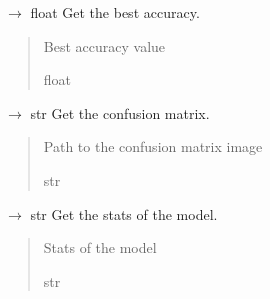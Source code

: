 \documentclass[letterpaper,10pt,english]{sphinxmanual}
\begin{document}

\begin{fulllineitems}
\label{\detokenize{autoapi/src/LSTMTrainer/index:src.LSTMTrainer.get_best_acc}}
\pysigstartsignatures
\pysiglinewithargsret
{}
{}
{{ $\rightarrow$ float}}
\pysigstopsignatures
\sphinxAtStartPar
Get the best accuracy.
\begin{quote}\begin{description}
\sphinxAtStartPar
Best accuracy value

\sphinxAtStartPar
float

\end{description}\end{quote}

\end{fulllineitems}


\begin{fulllineitems}
\label{\detokenize{autoapi/src/LSTMTrainer/index:src.LSTMTrainer.get_confusion_matrix}}
\pysigstartsignatures
\pysiglinewithargsret
{}
{}
{{ $\rightarrow$ str}}
\pysigstopsignatures
\sphinxAtStartPar
Get the confusion matrix.
\begin{quote}\begin{description}
\sphinxAtStartPar
Path to the confusion matrix image

\sphinxAtStartPar
str

\end{description}\end{quote}

\end{fulllineitems}


\begin{fulllineitems}
\label{\detokenize{autoapi/src/LSTMTrainer/index:src.LSTMTrainer.stats}}
\pysigstartsignatures
\pysiglinewithargsret
{}
{}
{{ $\rightarrow$ str}}
\pysigstopsignatures
\sphinxAtStartPar
Get the stats of the model.
\begin{quote}\begin{description}
\sphinxAtStartPar
Stats of the model

\sphinxAtStartPar
str

\end{description}\end{quote}

\end{fulllineitems}
\end{document}
